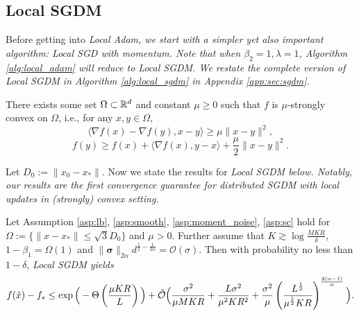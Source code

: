 \documentclass{article} %
\numberwithin{equation}{section}
\begin{document}
\subsection{Local SGDM}\label{subsec:sgdm}

Before getting into \em Local \em Adam, we start with a simpler yet also important algorithm: \em Local \em SGD with momentum. 
Note that when $\beta_2=1, \lambda=1$, Algorithm \ref{alg:local_adam} will reduce to \em Local \em SGDM. 
We restate the complete version of \em Local \em SGDM in Algorithm \ref{alg:local_sgdm} in Appendix \ref{app:sec:sgdm}.

\begin{asp}[Convexity]\label{asp:sc}
    There exists some set $\Omega\subset \mathbb{R}^d$ and constant $\mu\geq 0$ such that $f$ is $\mu$-strongly convex on $\Omega$, i.e., for any $x,y\in \Omega$,
    \begin{equation}
        \langle \nabla f(x) - \nabla f(y), x-y \rangle \geq \mu \|x-y\|^2,
    \end{equation}
    \begin{equation}
        f(y) \geq f(x) + \langle \nabla f(x), y-x\rangle + \frac{\mu}{2}\|x-y\|^2.
    \end{equation}
\end{asp}

Let $D_0:=\|x_0-x_*\|$.
Now we state the results for \em Local \em SGDM below. 
Notably, our results are the first convergence guarantee for distributed SGDM with local updates in (strongly) convex setting. 

\begin{thm}\label{thm:sgdm_sc}
    Let Assumption \ref{asp:lb}, \ref{asp:smooth}, \ref{asp:moment_noise}, \ref{asp:sc} hold for $\Omega:=\{\|x-x_*\|\leq \sqrt{3}D_0\}$ and $\mu>0$. Further assume that $K\gtrsim\log\frac{MKR}{\delta}$, $1-\beta_1=\Omega(1)$ and $\|\boldsymbol{\sigma}\|_{2\alpha}d^{\frac{1}{2}-\frac{1}{2\alpha}}=\mathcal{O}(\sigma)$.
    Then with probability no less than $1-\delta$, \em Local \em SGDM yields 
    \begin{equation}\label{eq:f_bound_sgdm_sc}
        f(\hat{x})-f_* \leq
        \exp\Big(-\Theta\left(\frac{\mu KR}{L}\right)\Big) + \Tilde{\mathcal{O}}\Big(\frac{\sigma^2}{\mu MKR} + \frac{L\sigma^2}{\mu^2KR^2} + \frac{\sigma^2}{\mu} \left(\frac{L^{\frac{1}{2}}}{\mu^{\frac{1}{2}}KR}\right)^{\frac{2(\alpha-1)}{\alpha}}\Big).
    \end{equation}
\end{thm}
\end{document}
